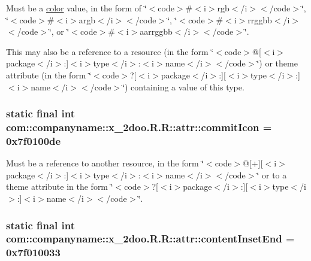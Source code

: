 Must be a \hyperlink{classcom_1_1companyname_1_1x__2doo_1_1_r_1_1color}{color} value, in the form of \char`\"{}$<$code$>$\#$<$i$>$rgb$<$/i$>$$<$/code$>$\char`\"{}, \char`\"{}$<$code$>$\#$<$i$>$argb$<$/i$>$$<$/code$>$\char`\"{}, \char`\"{}$<$code$>$\#$<$i$>$rrggbb$<$/i$>$$<$/code$>$\char`\"{}, or \char`\"{}$<$code$>$\#$<$i$>$aarrggbb$<$/i$>$$<$/code$>$\char`\"{}. 

This may also be a reference to a resource (in the form \char`\"{}$<$code$>$@\mbox{[}$<$i$>$package$<$/i$>$:\mbox{]}$<$i$>$type$<$/i$>$:$<$i$>$name$<$/i$>$$<$/code$>$\char`\"{}) or theme attribute (in the form \char`\"{}$<$code$>$?\mbox{[}$<$i$>$package$<$/i$>$:\mbox{]}\mbox{[}$<$i$>$type$<$/i$>$:\mbox{]}$<$i$>$name$<$/i$>$$<$/code$>$\char`\"{}) containing a value of this type. \hypertarget{classcom_1_1companyname_1_1x__2doo_1_1_r_1_1attr_5ca5c429cbbc63b5e5145c03fba3506a}{
\subsubsection[{commitIcon}]{\setlength{\rightskip}{0pt plus 5cm}static final int com::companyname::x\_\-2doo.R.R::attr::commitIcon = 0x7f0100de}}
\label{classcom_1_1companyname_1_1x__2doo_1_1_r_1_1attr_5ca5c429cbbc63b5e5145c03fba3506a}


Must be a reference to another resource, in the form \char`\"{}$<$code$>$@\mbox{[}+\mbox{]}\mbox{[}$<$i$>$package$<$/i$>$:\mbox{]}$<$i$>$type$<$/i$>$:$<$i$>$name$<$/i$>$$<$/code$>$\char`\"{} or to a theme attribute in the form \char`\"{}$<$code$>$?\mbox{[}$<$i$>$package$<$/i$>$:\mbox{]}\mbox{[}$<$i$>$type$<$/i$>$:\mbox{]}$<$i$>$name$<$/i$>$$<$/code$>$\char`\"{}. \hypertarget{classcom_1_1companyname_1_1x__2doo_1_1_r_1_1attr_58c86668d5cc32508a8afdee1e07a9d8}{
\subsubsection[{contentInsetEnd}]{\setlength{\rightskip}{0pt plus 5cm}static final int com::companyname::x\_\-2doo.R.R::attr::contentInsetEnd = 0x7f010033}}
\label{classcom_1_1companyname_1_1x__2doo_1_1_r_1_1attr_58c86668d5cc32508a8afdee1e07a9d8}


